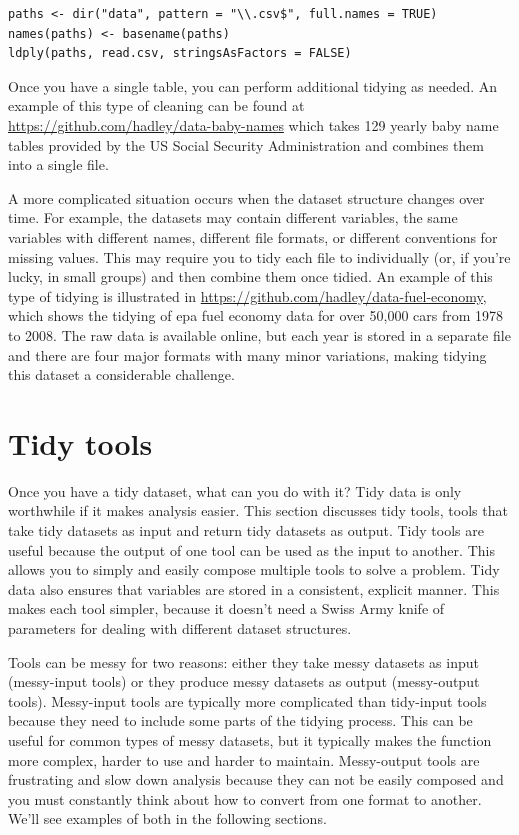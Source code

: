\documentclass[article]{jss}
\begin{document}
\begin{Verbatim}
paths <- dir("data", pattern = "\\.csv$", full.names = TRUE)
names(paths) <- basename(paths)
ldply(paths, read.csv, stringsAsFactors = FALSE)
\end{Verbatim}

Once you have a single table, you can perform additional tidying as needed. An example of this type of cleaning can be found at \url{https://github.com/hadley/data-baby-names} which takes 129 yearly baby name tables provided by the US Social Security Administration and combines them into a single file.

A more complicated situation occurs when the dataset structure changes over time. For example, the datasets may contain different variables, the same variables with different names, different file formats, or different conventions for missing values. This may require you to tidy each file to individually (or, if you're lucky, in small groups) and then combine them once tidied. An example of this type of tidying is illustrated in \url{https://github.com/hadley/data-fuel-economy}, which shows the tidying of {\sc epa} fuel economy data for over 50,000 cars from 1978 to 2008. The raw data is available online, but each year is stored in a separate file and there are four major formats with many minor variations, making tidying this dataset a considerable challenge.

\section{Tidy tools}
\label{sec:tidy-tools}

Once you have a tidy dataset, what can you do with it? Tidy data is only worthwhile if it makes analysis easier. This section discusses tidy tools, tools that take tidy datasets as input and return tidy datasets as output. Tidy tools are useful because the output of one tool can be used as the input to another. This allows you to simply and easily compose multiple tools to solve a problem. Tidy data also ensures that variables are stored in a consistent, explicit manner. This makes each tool simpler, because it doesn't need a Swiss Army knife of parameters for dealing with different dataset structures.

Tools can be messy for two reasons: either they take messy datasets as input (messy-input tools) or they produce messy datasets as output (messy-output tools). Messy-input tools are typically more complicated than tidy-input tools because they need to include some parts of the tidying process. This can be useful for common types of messy datasets, but it typically makes the function more complex, harder to use and harder to maintain. Messy-output tools are frustrating and slow down analysis because they can not be easily composed and you must constantly think about how to convert from one format to another. We'll see examples of both in the following sections.
\end{document}
